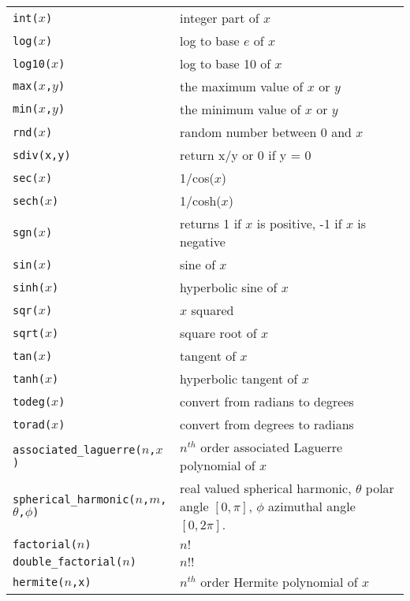 \begin{supertabular}{ll}
{\tt int($x$)}          	& integer part of $x$ \\
{\tt log($x$)}          	& log to base $e$ of $x$ \\
{\tt log10($x$)}      	& log to base 10 of $x$ \\
{\tt max($x$,$y$)}         & the maximum value of $x$ or $y$ \\
{\tt min($x$,$y$)}         & the minimum value of $x$ or $y$ \\
{\tt rnd($x$)}          	& random number between 0 and $x$ \\
{\tt sdiv(x,y)} 	     	& return x/y or 0 if y = 0 \\
{\tt sec($x$)} 	     	& 1/cos($x$) \\
{\tt sech($x$)}        	& 1/cosh($x$) \\
{\tt sgn($x$)}          	& returns 1 if $x$ is positive, -1 if $x$ is negative \\
{\tt sin($x$)}          	& sine of $x$ \\
{\tt sinh($x$)}        	& hyperbolic sine of $x$ \\
{\tt sqr($x$)}          	& $x$ squared  \\
{\tt sqrt($x$)}        	& square root of $x$ \\
{\tt tan($x$)}          	& tangent of $x$ \\	
{\tt tanh($x$)}        	& hyperbolic tangent of $x$ \\
{\tt todeg($x$)}      	& convert from radians to degrees \\
{\tt torad($x$)}      	& convert from degrees to radians \\
{\tt associated\_laguerre($n$,$x$)}    & $n^{th}$ order associated Laguerre polynomial of $x$   \\
{\tt spherical\_harmonic($n$,$m$,$\theta$,$\phi$)}        & real valued spherical harmonic, $\theta$ polar angle $[0,\pi]$, $\phi$ azimuthal angle $[0,2\pi]$. \\
{\tt factorial($n$)}      	           & $n!$ \\
{\tt double\_factorial($n$)}       & $n!!$  \\
{\tt hermite($n$,x)}      	               & $n^{th}$ order Hermite polynomial of $x$ \\

\end{supertabular}
